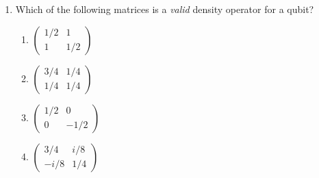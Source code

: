 \documentclass[11pt,a4paper]{article}
\begin{document}
\begin{tcolorbox}[ugconceptbox, title={Part I --- Multiple Choice \hfill\normalfont 4 questions $\times$ 2 pts = 8 pts}]
\begin{enumerate}[leftmargin=1.8em, label=\textbf{Q\arabic*.}, itemsep=10pt]
\item {}
  Which of the following matrices is a \emph{valid} density operator for a qubit?

  \begin{enumerate}[label=(\Alph*), itemsep=2pt]
    \item $\begin{pmatrix}1/2 & 1 \\ 1 & 1/2\end{pmatrix}$
    \item $\begin{pmatrix}3/4 & 1/4 \\ 1/4 & 1/4\end{pmatrix}$
    \item $\begin{pmatrix}1/2 & 0 \\ 0 & -1/2\end{pmatrix}$
    \item $\begin{pmatrix}3/4 & i/8 \\ -i/8 & 1/4\end{pmatrix}$
  \end{enumerate}

\end{enumerate}
\end{tcolorbox}
\end{document}
